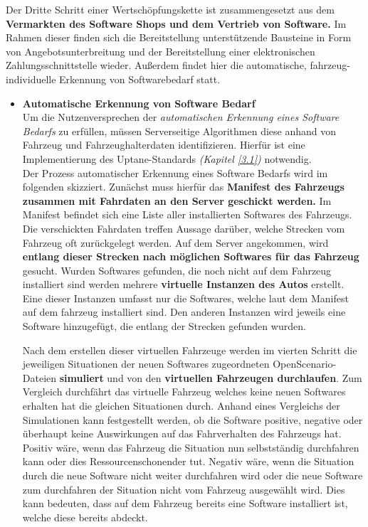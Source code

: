 Der Dritte Schritt einer Wertschöpfungskette ist zusammengesetzt aus dem\textbf{ Vermarkten des Software Shops und dem Vertrieb von Software. } Im Rahmen dieser finden sich die Bereitstellung unterstützende Bausteine in Form von Angebotsunterbreitung und der Bereitstellung einer elektronischen Zahlungsschnittstelle wieder. Außerdem findet hier die automatische, fahrzeug-individuelle Erkennung von Softwarebedarf statt.
\begin{itemize}
	\item[] \hspace{-0.6cm} \textbf{Automatische Erkennung von Software Bedarf}\\
	Um die Nutzenversprechen der \textit{automatischen Erkennung eines Software Bedarfs }zu erfüllen, müssen Serverseitige Algorithmen diese anhand von Fahrzeug und Fahrzeughalterdaten identifizieren. Hierfür ist eine Implementierung des Uptane-Standards \textit{(Kapitel \ref{3.1})} notwendig. \\
	
	Der Prozess automatischer Erkennung eines Software Bedarfs wird im folgenden skizziert. Zunächst muss hierfür das\textbf{ Manifest des Fahrzeugs zusammen mit Fahrdaten an den Server geschickt werden.} Im Manifest befindet sich eine Liste aller installierten Softwares des Fahrzeugs. Die verschickten Fahrdaten treffen Aussage darüber, welche Strecken vom Fahrzeug oft zurückgelegt werden. Auf dem Server angekommen, wird \textbf{entlang dieser Strecken nach möglichen Softwares für das Fahrzeug} gesucht. Wurden Softwares gefunden, die noch nicht auf dem Fahrzeug installiert sind werden mehrere \textbf{virtuelle Instanzen des Autos} erstellt. Eine dieser Instanzen umfasst nur die Softwares, welche laut dem Manifest auf dem fahrzeug installiert sind. Den anderen Instanzen wird jeweils eine Software hinzugefügt, die entlang der Strecken gefunden wurden.
	
	Nach dem erstellen dieser virtuellen Fahrzeuge werden im vierten Schritt die jeweiligen Situationen der neuen Softwares zugeordneten OpenScenario-Dateien \textbf{simuliert} und von den \textbf{virtuellen Fahrzeugen durchlaufen}. Zum Vergleich durchfährt das virtuelle Fahrzeug welches keine neuen Softwares erhalten hat die gleichen Situationen durch. Anhand eines Vergleichs der Simulationen kann festgestellt werden, ob die Software positive, negative oder überhaupt keine Auswirkungen auf das Fahrverhalten des Fahrzeugs hat. Positiv wäre, wenn das Fahrzeug die Situation nun selbstständig durchfahren kann oder dies Ressourcenschonender tut. Negativ wäre, wenn die Situation durch die neue Software nicht weiter durchfahren wird oder die neue Software zum durchfahren der Situation nicht vom Fahrzeug ausgewählt wird. Dies kann bedeuten, dass auf dem Fahrzeug bereits eine Software installiert ist, welche diese bereits abdeckt.\\
	

\end{itemize}
